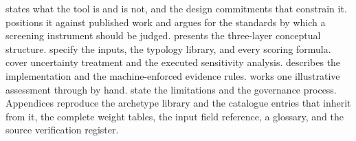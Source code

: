  states what the tool is and is not, and the design commitments
that constrain it.  positions it against published work and
argues for the standards by which a screening instrument should be judged.
 presents the three-layer conceptual structure.
 specify the inputs, the typology
library, and every scoring formula.
 cover uncertainty treatment and the
executed sensitivity analysis.  describes the
implementation and the machine-enforced evidence rules.
 works one illustrative assessment through by hand.
 state the limitations and the governance
process. Appendices reproduce the archetype library and the catalogue entries
that inherit from it, the complete weight tables, the input field reference, a
glossary, and the source verification register.
